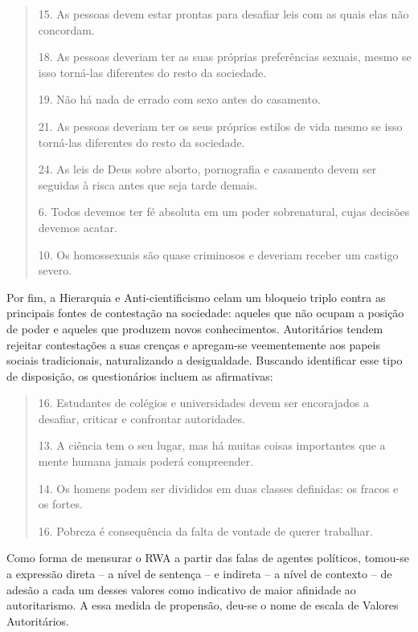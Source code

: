 \documentclass[
12pt,				%
openright,			%
twoside,			%
a4paper,			%
english,			%
french,				%
spanish,			%
brazil				%
]{abntex2}
\begin{document}
\begin{quote}
	
	15. As pessoas devem estar prontas para desafiar leis com as quais elas não concordam.
	
	
	18. As pessoas deveriam ter as suas próprias preferências sexuais, mesmo se isso torná-las diferentes do resto da sociedade.
	
	19. Não há nada de errado com sexo antes do casamento.
	
	21. As pessoas deveriam ter os seus próprios estilos de vida mesmo se isso torná-las diferentes do resto da sociedade.
	
	24. As leis de Deus sobre aborto, pornografia e casamento devem ser seguidas à risca antes que seja tarde demais.
	
	6. Todos devemos ter fé absoluta em um poder sobrenatural, cujas decisões devemos acatar.
	
	10. Os homossexuais são quase criminosos e deveriam receber um castigo severo.
	
	\cite{vilanova2018adaptaccao, de2018analises}
	
\end{quote}

Por fim, a Hierarquia e Anti-cientificismo celam um bloqueio triplo contra as principais fontes de contestação na sociedade: aqueles que não ocupam a posição de poder e aqueles que produzem novos conhecimentos. Autoritários tendem rejeitar contestações a suas crenças e apregam-se veementemente aos papeis sociais tradicionais, naturalizando a desigualdade. Buscando identificar esse tipo de disposição, os questionários incluem as afirmativas:
 
\begin{quote}
	
	16. Estudantes de colégios e universidades devem ser encorajados a desafiar, criticar e confrontar autoridades.
	
	13. A ciência tem o seu lugar, mas há muitas coisas importantes que a mente humana jamais poderá compreender.
	
	14. Os homens podem ser divididos  em duas classes definidas:  os fracos e os fortes.
	
	16. Pobreza é consequência da falta de vontade de querer trabalhar.
	
	\cite{vilanova2018adaptaccao, de2018analises}
	
\end{quote}

Como forma de mensurar o RWA a partir das falas de agentes políticos, tomou-se a expressão direta -- a nível de sentença -- e indireta -- a nível de contexto -- de adesão a cada um desses valores como indicativo de maior afinidade ao autoritarismo. A essa medida de propensão, deu-se o nome de escala de Valores Autoritários.
\end{document}
